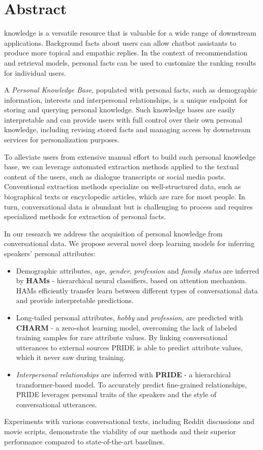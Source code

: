 \section*{Abstract}
\label{abstract}


 knowledge is a versatile resource that is valuable for a wide range of downstream applications.
Background facts about users can allow chatbot assistants to produce more topical and empathic replies.
In the context of recommendation and retrieval models, personal facts can be used to customize the ranking results for individual users.

A \textit{Personal Knowledge Base}, populated with personal facts, such as demographic information, interests and interpersonal relationships, is a unique endpoint for storing and querying personal knowledge. 
Such knowledge bases are easily interpretable and can provide users with full control over their own personal knowledge, including revising stored facts and managing access by downstream services for personalization purposes.

To alleviate users from extensive manual effort to build such personal knowledge base, we can leverage automated extraction methods applied to the textual content of the users, such as dialogue transcripts or social media posts. Conventional extraction methods specialize on well-structured data, such as biographical texts or encyclopedic articles, which are rare for most people.
In turn, conversational data is abundant but is challenging to process and requires specialized methods for extraction of personal facts.

In our research we address the acquisition of personal knowledge from conversational data. We propose several novel deep learning models for inferring speakers' personal attributes:
\begin{itemize}
    \item Demographic attributes, \textit{age}, \textit{gender}, \textit{profession} and \textit{family status} are inferred by \textbf{HAMs} - hierarchical neural classifiers, based on attention mechanism. HAMs efficiently transfer learn between different types of conversational data and provide interpretable predictions.
    
    \item Long-tailed personal attributes, \textit{hobby} and \textit{profession}, are predicted with \textbf{CHARM} - a zero-shot learning model, overcoming the lack of labeled training samples for rare attribute values. By linking conversational utterances to external sources PRIDE is able to predict attribute values, which it never saw during training.
    
    \item \textit{Interpersonal relationships} are inferred with \textbf{PRIDE} - a hierarchical transformer-based model. To accurately predict fine-grained relationships, PRIDE leverages personal traits of the speakers and the style of conversational utterances.
\end{itemize}

Experiments with various conversational texts, including Reddit discussions and movie scripts, demonstrate the viability of our methods and their superior performance compared to state-of-the-art baselines.